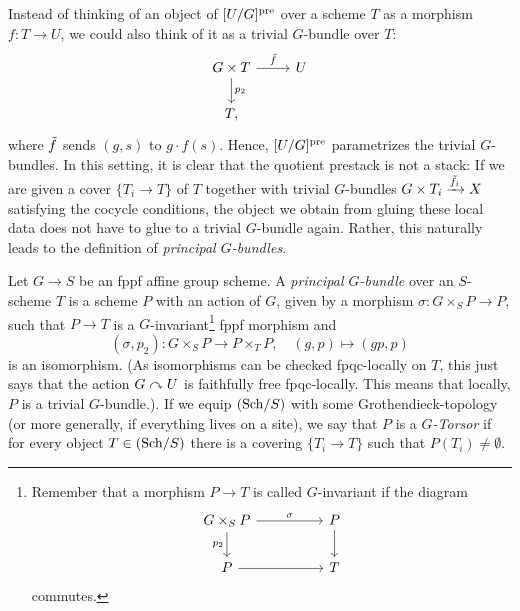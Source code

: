\documentclass[a4paper,11pt]{article}
\begin{document}
Instead of thinking of an object of $[U/G]^{\mathrm{pre}}$ over a scheme $T$ 
as a morphism $f: T \to U$, we could also think of it as a trivial 
$G$-bundle over $T$:
\[\begin{tikzcd}[ampersand replacement=\&]
	{G \times T} \& U \\
	T,
	\arrow["{p_2}", from=1-1, to=2-1]
	\arrow["\tilde f", from=1-1, to=1-2]
\end{tikzcd}\]
where $\Tilde f$ sends $(g,s)$ to $g \cdot f(s)$. Hence, 
$[U/G]^{\mathrm{pre}}$ parametrizes the trivial $G$-bundles. In this setting,
it is clear that the quotient prestack is not a stack: If we are given 
a cover $\{T_i \to T\}$ of $T$ together with trivial $G$-bundles 
$G \times T_i \xrightarrow{\tilde f_i} X$ satisfying the cocycle conditions, the object 
we obtain from gluing these local data does not have to glue to a trivial
$G$-bundle again. Rather, this naturally leads to the definition of 
\textit{principal $G$-bundles}. 


\begin{defi}
    Let $G \to S$ be an fppf affine group scheme. A \textit{principal
    $G$-bundle} over an $S$-scheme $T$ is a 
    scheme $P$ with an action of $G$, given by a morphism
    $\sigma: G \times_S P \to P$, such that 
    $P \to T$ is a $G$-invariant\footnote{Remember that a morphism $P \to T$ is called $G$-invariant if the diagram
\[\begin{tikzcd}[ampersand replacement=\&]
	{G \times_S P} \&\& P \\
	P \&\& T
	\arrow["\sigma", from=1-1, to=1-3]
	\arrow[from=1-3, to=2-3]
	\arrow[from=2-1, to=2-3]
	\arrow["{p_2}"', from=1-1, to=2-1]
\end{tikzcd}\]
commutes.}
fppf morphism and 
    \begin{equation*}
        (\sigma, p_2): G \times_S P \to P \times_T P, \quad
        (g,p) \mapsto (gp, p)
    \end{equation*}
    is an isomorphism. (As isomorphisms can be checked fpqc-locally on $T$, this just
    says that the action $G \curvearrowright U$ is faithfully free fpqc-locally. This 
    means that locally, $P$ is a trivial $G$-bundle.). If we equip $(\mathrm{Sch}/ S)$
    with some Grothendieck-topology (or more generally, if everything lives on
    a site), we say that $P$ is a \textit{$G$-Torsor} if for every object $T
    \in (\mathrm{Sch}/ S)$ there is a covering $\{T_i \to T\}$ such that $P(T_i) \neq
    \emptyset$. 
\end{defi}
\end{document}
